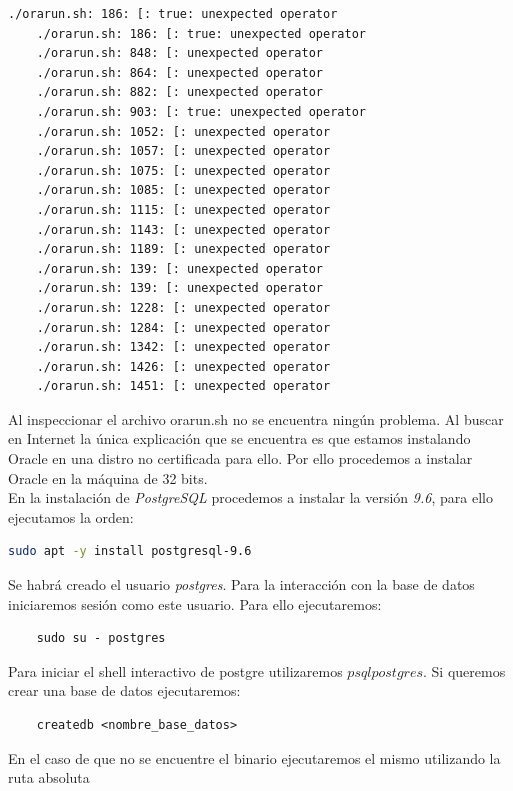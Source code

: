 \documentclass{article}
\begin{document}
\begin{lstlisting}[language=bash]
	./orarun.sh: 186: [: true: unexpected operator
	./orarun.sh: 186: [: true: unexpected operator
	./orarun.sh: 848: [: unexpected operator
	./orarun.sh: 864: [: unexpected operator
	./orarun.sh: 882: [: unexpected operator
	./orarun.sh: 903: [: true: unexpected operator
	./orarun.sh: 1052: [: unexpected operator
	./orarun.sh: 1057: [: unexpected operator
	./orarun.sh: 1075: [: unexpected operator
	./orarun.sh: 1085: [: unexpected operator
	./orarun.sh: 1115: [: unexpected operator
	./orarun.sh: 1143: [: unexpected operator
	./orarun.sh: 1189: [: unexpected operator
	./orarun.sh: 139: [: unexpected operator
	./orarun.sh: 139: [: unexpected operator
	./orarun.sh: 1228: [: unexpected operator
	./orarun.sh: 1284: [: unexpected operator
	./orarun.sh: 1342: [: unexpected operator
	./orarun.sh: 1426: [: unexpected operator
	./orarun.sh: 1451: [: unexpected operator
\end{lstlisting}

Al inspeccionar el archivo orarun.sh no se encuentra ningún problema. Al buscar en Internet la única explicación que se encuentra es que estamos instalando
Oracle en una distro no certificada para ello.
Por ello procedemos a instalar Oracle en la máquina de 32 bits.\\

En la instalación de \emph{PostgreSQL} procedemos a instalar la versión \emph{9.6}, para ello ejecutamos la orden: \\

\begin{lstlisting}[language=bash]
    sudo apt -y install postgresql-9.6
\end{lstlisting}

Se habrá creado el usuario \emph{postgres}. Para la interacción con la base de datos iniciaremos sesión como este usuario. Para ello ejecutaremos:

\begin{lstlisting}
    sudo su - postgres
\end{lstlisting}

Para iniciar el shell interactivo de postgre utilizaremos $psql postgres$. Si queremos crear una base de datos ejecutaremos:
\begin{lstlisting}
    createdb <nombre_base_datos>
\end{lstlisting}

En el caso de que no se encuentre el binario ejecutaremos el mismo utilizando la ruta absoluta
\end{document}
